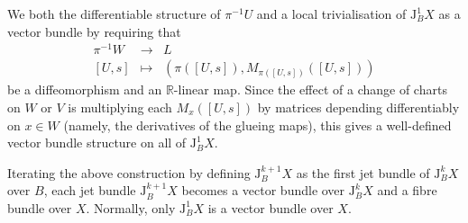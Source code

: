 \documentclass[12pt]{article}
\def\J{\mathrm{J}}
\begin{document}
We  both the differentiable structure of
$\pi^{-1}U$ and a local trivialisation of $\J^1_BX$ as a vector bundle
by requiring that
\begin{eqnarray*}
\pi^{-1}W&\to&L \\
{}[U,s] &\mapsto&\left(\pi([U,s]),M_{\pi([U,s])}([U,s])\right)
\end{eqnarray*}
be a diffeomorphism and an $\mathbb{R}$-linear map.  Since the effect
of a change of charts on $W$ or $V$ is multiplying each $M_x([U,s])$ by
matrices depending differentiably on $x\in W$ (namely, the derivatives
of the glueing maps), this gives a well-defined vector bundle
structure on all of $\J^1_BX$.

Iterating the above construction by defining $\J^{k+1}_BX$ as the first
jet bundle of $\J^k_BX$ over $B$, each jet bundle $\J^{k+1}_BX$ becomes
a vector bundle over $\J^k_BX$ and a fibre bundle over $X$.  Normally,
only $\J^1_BX$ is a vector bundle over $X$.
\end{document}
